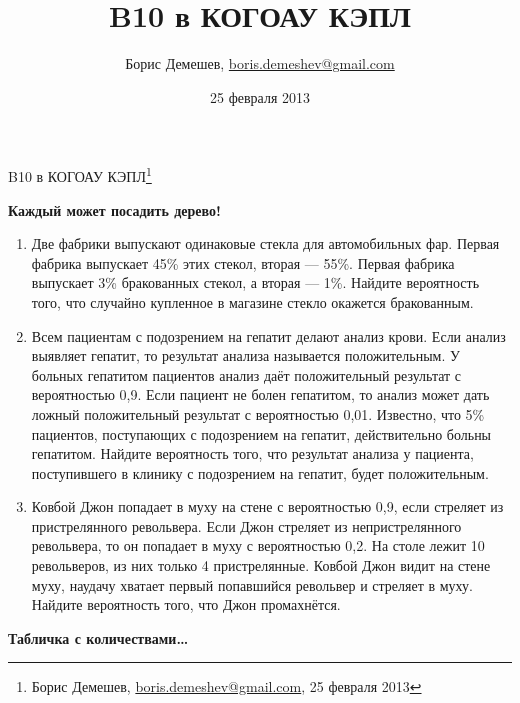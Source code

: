 \documentclass[pdftex,12pt,a4paper]{article}
\title{B10 в КОГОАУ КЭПЛ}
\author{Борис Демешев, \href{mailto:boris.demeshev@gmail.com}{boris.demeshev@gmail.com}}
\date{25 февраля 2013}
\begin{document}
\begin{center}
{\Large B10 в КОГОАУ КЭПЛ\footnote{Борис Демешев, \href{mailto:boris.demeshev@gmail.com}{boris.demeshev@gmail.com}, 25 февраля 2013}}
\end{center}

\textbf{Каждый может посадить дерево!}

\begin{enumerate}

\item Две фабрики выпускают одинаковые стекла для автомобильных фар. Первая фабрика выпускает 45\% этих стекол, вторая --- 55\%. Первая фабрика выпускает 3\% бракованных стекол, а вторая --- 1\%. Найдите вероятность того, что случайно купленное в магазине стекло окажется бракованным.

\item Всем пациентам с подозрением на гепатит делают анализ крови. Если анализ выявляет гепатит, то результат анализа называется положительным. У больных гепатитом пациентов анализ даёт положительный результат с вероятностью 0,9. Если пациент не болен гепатитом, то анализ может дать ложный положительный результат с вероятностью 0,01. Известно, что 5\% пациентов, поступающих с подозрением на гепатит, действительно больны гепатитом. Найдите вероятность того, что результат анализа у пациента, поступившего в клинику с подозрением на гепатит, будет положительным.

\item Ковбой Джон попадает в муху на стене с вероятностью 0,9, если стреляет из пристрелянного револьвера. Если Джон стреляет из непристрелянного револьвера, то он попадает в муху с вероятностью 0,2. На столе лежит 10 револьверов, из них только 4 пристрелянные. Ковбой Джон видит на стене муху, наудачу хватает первый попавшийся револьвер и стреляет в муху. Найдите вероятность того, что Джон промахнётся.
\end{enumerate}

\textbf{Табличка с количествами\ldots}
\end{document}
